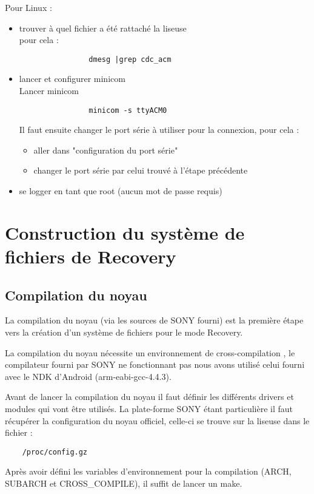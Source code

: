 Pour Linux : 
\begin{itemize}
	\item trouver à quel fichier a été rattaché la liseuse \\
		pour cela : 
			\begin{verbatim}
				dmesg |grep cdc_acm
			\end{verbatim}
	\item lancer et configurer minicom \\
		Lancer minicom\\
			\begin{verbatim}
				minicom -s ttyACM0
			\end{verbatim}
		Il faut ensuite changer le port série à utiliser pour la connexion, pour cela : \\	
		\begin{itemize}
			\item aller dans "configuration du port série"
			\item changer le port série par celui trouvé à l'étape précédente
		\end{itemize}
	\item se logger en tant que root (aucun mot de passe requis)
\end{itemize}

\section{Construction du système de fichiers de Recovery}
\subsection{Compilation du noyau}

La compilation du noyau (via les sources de SONY fourni) est la première étape vers la création d'un système de fichiers pour le mode Recovery.

La compilation du noyau nécessite un environnement de cross-compilation , le compilateur fourni par SONY ne fonctionnant pas nous avons utilisé celui fourni avec le NDK d'Android (arm-eabi-gcc-4.4.3).

Avant de lancer la compilation du noyau il faut définir les différents drivers et modules qui vont être utilisés. La plate-forme SONY étant particulière il faut récupérer la configuration du noyau officiel, celle-ci se trouve sur la liseuse dans le fichier : 
\begin{verbatim}
	/proc/config.gz
\end{verbatim}
 Après avoir défini les variables d'environnement pour la compilation (ARCH, SUBARCH et CROSS_COMPILE), il suffit de lancer un make.
 
